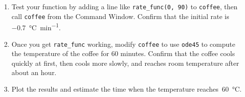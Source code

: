\begin{ex}
\begin{enumerate}
\item Test your function by adding a line like \lstinline{rate_func(0, 90)}
to \lstinline{coffee}, then call \lstinline{coffee} from the Command Window.
Confirm that the initial rate is \SI{-0.7}{\celsius \per \minute}.

\item Once you get \lstinline{rate_func} working, modify
\lstinline{coffee} to use \lstinline{ode45} to compute the temperature
of the coffee for 60 minutes.  Confirm that
the coffee cools quickly at first, then cools more slowly, and reaches
room temperature after about an hour.

\item Plot the results and estimate the time when the temperature reaches~\SI{60}{\celsius}.

\end{enumerate}

\end{ex}
